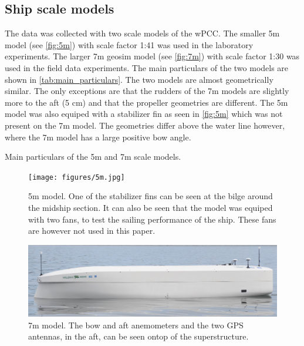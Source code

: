 \subsection{Ship scale models}
\label{sec:ship_scale_models}
The data was collected with two scale models of the wPCC. The smaller 5m model (see \autoref{fig:5m}) with scale factor 1:41 was used in the laboratory experiments. The larger 7m geosim model (see \autoref{fig:7m}) with scale factor 1:30 was used in the field data experiments. The main particulars of the two models are shown in \autoref{tab:main_particulars}. The two models are almost geometrically similar. The only exceptions are that the rudders of the 7m models are slightly more to the aft (5 cm) and that the propeller geometries are different. The 5m model was also equiped with a stabilizer fin as seen in \autoref{fig:5m} which was not present on the 7m model. The geometries differ above the water line however, where the 7m model has a large positive bow angle.

\begin{table}[!ht]
    \centering
    \caption{Main particulars of the 5m and 7m scale models.}
    \label{tab:main_particulars}
\end{table}

\begin{figure}[!ht]
    \texttt{[image: figures/5m.jpg]}
    \caption{5m model. One of the stabilizer fins can be seen at the bilge around the midship section. It can also be seen that the model was equiped with two fans, to test the sailing performance of the ship. These fans are however not used in this paper.}
    \label{fig:5m}
\end{figure}

\begin{figure}[!ht]
    \includegraphics[width=\textwidth]{figures/7m.jpg}
    \caption{7m model. The bow and aft anemometers and the two GPS antennas, in the aft, can be seen ontop of the superstructure.}
    \label{fig:7m}
\end{figure}